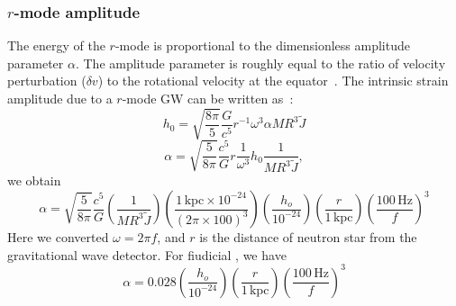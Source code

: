 \documentclass{ttuthes2007}
\begin{document}
\subsubsection{$r$-mode amplitude}
The energy of the $r$-mode is proportional to the dimensionless amplitude
parameter $\alpha$. The amplitude parameter is roughly equal to the ratio of
velocity perturbation ($\delta v$) to the rotational velocity at the
equator~\cite{Ian}. The
intrinsic strain amplitude due to a $r$-mode \ac{GW} can be written
as~\cite{Owen_2010}:
\begin{equation*}                                                               
h_0 =\sqrt{\frac{8\pi}{5}}\frac{G}{c^5}r^{-1}\omega^3 \alpha M R^3 \tilde{J}      
\end{equation*}                                                                 
\begin{equation*}                                                               
\alpha = \sqrt{\frac{5}{8\pi}}\frac{c^5}{G} r \frac{1}{\omega^3} h_0 \frac{1}{M   
R^3 \tilde{J}},                                                                  
\end{equation*}
we obtain                                                                 
\begin{equation*}                                                               
\alpha=\sqrt{\frac{5}{8\pi}}\frac{c^5}{G}\left(\frac{1}{M                       
R^3 \tilde{J}}\right)\left(\frac{1\,\mathrm{kpc}\times 10^{-24}}{(2\pi \times
100)^3}\right)
\left(\frac{h_o}{10^{-24}}\right)\left(\frac{r}{1\,\mathrm{kpc}}\right)\left(\frac{100\,\mathrm{Hz}}{f}\right)^3
\end{equation*}                                                                 
Here we converted $\omega=2\pi f$, and $r$ is the distance of neutron star from
the gravitational wave detector. For fiudicial , we have                         
\begin{equation} 
\alpha
=0.028\left(\frac{h_o}{10^{-24}}\right)\left(\frac{r}{1\,\mathrm{kpc}}\right)\left(\frac{100\,\mathrm{Hz}}{f}\right)^3
\end{equation}           
\end{document}
